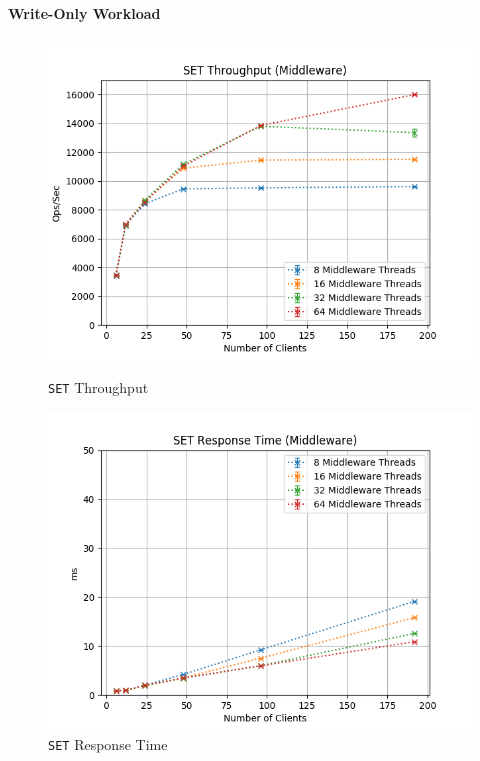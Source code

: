 \documentclass[11pt,a4paper]{article}
\begin{document}
\paragraph{Write-Only Workload}
%
\begin{figure}[H]
	\centering
    \begin{minipage}{0.5\textwidth}
        \centering
        \includegraphics[width=\textwidth]{../illustrations/plots/2_2_two_middlewares/1-0/middleware_set_tp_s.png}
        \caption{\texttt{SET} Throughput}
        \label{fig:two_middlewares_set_tp_mw}
    \end{minipage}\hfill
    \begin{minipage}{0.5\textwidth}
        \centering
        \includegraphics[width=\textwidth]{../illustrations/plots/2_2_two_middlewares/1-0/middleware_set_rt_ms.png}
        \caption{\texttt{SET} Response Time}
        \label{fig:two_middlewares_set_rt_mw}
    \end{minipage}
\end{figure}
\end{document}
